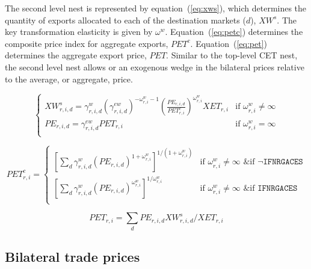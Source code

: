 \documentclass[11pt,letterpaper]{report}
\begin{document}
The second level nest is represented by equation~(\ref{eq:xws}), which
determines the quantity of exports allocated to each of the destination markets
($d$), $\mathit{XW}^s$. The key transformation elasticity is given by
$\omega^w$.
Equation~(\ref{eq:petc}) determines the composite price index for
aggregate exports, $\mathit{PET}^c$.
Equation~(\ref{eq:pet}) determines the aggregate export price,
$\mathit{PET}$. Similar to the top-level CET nest, the second level nest allows or an
exogenous wedge in the bilateral prices relative to the average, or aggregate,
price.

\begin{equation}
\label{eq:xws}
\begin{cases}
\displaystyle \mathit{XW}^s_{r,i,d} =
   \gamma^{\mathit{w}}_{r,i,d}
   \left( \gamma^{\mathit{ew}}_{r,i,d}
   \right)^{-\omega^w_{r,i}-1}
   \left( \frac {\mathit{PE}_{r,i,d}} {\mathit{PET}^c_{r,i}}
   \right)^{\omega^{\mathit{w}}_{r,\mathit{i}}}
   \mathit{XET_{r,i}}
&  \textrm{if } \omega^w_{r,i} \ne \infty \\
\displaystyle \mathit{PE}_{r,i,d} =
   \gamma^{\mathit{ew}}_{r,i,d} \mathit{PET}_{r,i}
& \textrm{if } \omega^w_{r,i} = \infty \\
\end{cases}
\end{equation}

\begin{equation}
\label{eq:petc}
\mathit{PET}^c_{r,i} =
\begin{cases}
\left[ \displaystyle \sum_d{
\gamma^{\mathit{w}}_{r,i,d} \left( \mathit{PE}_{r,i,d} \right)^{1 + \omega^w_{r,i}}}
\right]^{1/(1 + \omega^w_{r,i})}
&  \textrm{if } \omega^w_{r,i} \ne \infty \textrm{ \& if } \lnot \texttt{IFNRGACES} \\
\left[ \displaystyle \sum_d{
\gamma^{\mathit{w}}_{r,i,d} \left( \mathit{PE}_{r,i,d} \right)^{\omega^w_{r,i}}}
\right]^{1/\omega^w_{r,i}}
&  \textrm{if } \omega^w_{r,i} \ne \infty \textrm{ \& if } \texttt{IFNRGACES} \\
\end{cases}
\end{equation}

\begin{equation}
\label{eq:pet}
\mathit{PET}_{r,i}  =
   \sum_d{ \mathit{PE}_{r,i,d} \mathit{XW}^s_{r,i,d} } \bigg / \mathit{XET}_{r,i}
\end{equation}

\subsection{Bilateral trade prices}
\end{document}
